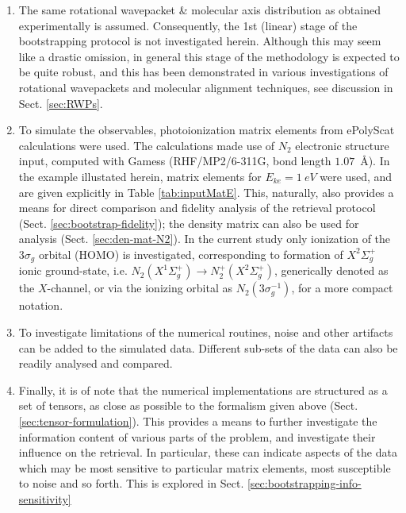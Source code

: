 \documentclass[10pt]{article}
\begin{document}
\begin{enumerate}
\item The same rotational wavepacket \& molecular axis distribution as obtained experimentally is assumed. Consequently, the 1st (linear) stage of the bootstrapping protocol is not investigated herein. Although this may seem like a drastic omission, in general this stage of the methodology is expected to be quite robust, and this has been demonstrated in various investigations of rotational wavepackets and molecular alignment techniques, see discussion in Sect. \ref{sec:RWPs}.
\item To simulate the observables, photoionization matrix elements from ePolyScat \cite{Lucchese1986, Gianturco1994, Natalense1999, luccheseEPolyScatUserManual} calculations were used. The calculations made use of $N_2$ electronic structure input, computed with Gamess \cite{gamess, Gordon} (RHF/MP2/6-311G, bond length $1.07$~\AA). In the example illustated herein, matrix elements for $E_{ke}=1~eV$ were used, and are given explicitly in Table \ref{tab:inputMatE}. This, naturally, also provides a means for direct comparison and fidelity analysis of the retrieval protocol (Sect. \ref{sec:bootstrap-fidelity}); the density matrix can also be used for analysis (Sect. \ref{sec:den-mat-N2}). In the current study only ionization of the $3\sigma_g$ orbital (HOMO) is investigated, corresponding to formation of  $X^2\Sigma_{g}^{+}$ ionic ground-state, i.e. $N_2(X^{1}\Sigma^{+}_{g}) \rightarrow N^+_2(X^{2}\Sigma^{+}_{g})$, generically denoted as the $X$-channel, or via the ionizing orbital as $N_2(3\sigma_g^{-1})$, for a more compact notation. 
\item To investigate limitations of the numerical routines, noise and other artifacts can be added to the simulated data. Different sub-sets of the data can also be readily analysed and compared.
\item Finally, it is of note that the numerical implementations are structured as a set of tensors, as close as possible to the formalism given above (Sect. \ref{sec:tensor-formulation}). This provides a means to further investigate the information content of various parts of the problem, and investigate their influence on the retrieval. In particular, these can indicate aspects of the data which may be most sensitive to particular matrix elements, most susceptible to noise and so forth. This is explored in Sect. \ref{sec:bootstrapping-info-sensitivity}
\end{enumerate}
\end{document}
